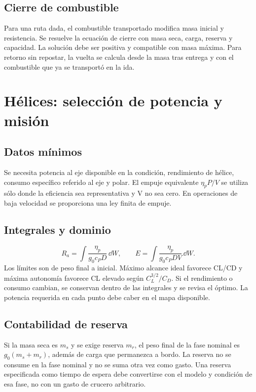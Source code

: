 \section{Cierre de combustible}
Para una ruta dada, el combustible transportado modifica masa inicial y resistencia. Se resuelve la ecuación de cierre con masa seca, carga, reserva y capacidad. La solución debe ser positiva y compatible con masa máxima. Para retorno sin repostar, la vuelta se calcula desde la masa tras entrega y con el combustible que ya se transportó en la ida.

\chapter{Hélices: selección de potencia y misión}
\section{Datos mínimos}
Se necesita potencia al eje disponible en la condición, rendimiento de hélice, consumo específico referido al eje y polar. El empuje equivalente $\eta_pP/V$ se utiliza sólo donde la eficiencia sea representativa y V no sea cero. En operaciones de baja velocidad se proporciona una ley finita de empuje.

\section{Integrales y dominio}
\begin{equation}
R_a=\int\frac{\eta_p}{g_0c_PD}\,\dd W,\qquad
E=\int\frac{\eta_p}{g_0c_PDV}\,\dd W.
\end{equation}
Los límites son de peso final a inicial. Máximo alcance ideal favorece CL/CD y máxima autonomía favorece CL elevado según $C_L^{3/2}/C_D$. Si el rendimiento o consumo cambian, se conservan dentro de las integrales y se revisa el óptimo. La potencia requerida en cada punto debe caber en el mapa disponible.

\section{Contabilidad de reserva}
Si la masa seca es $m_s$ y se exige reserva $m_r$, el peso final de la fase nominal es $g_0(m_s+m_r)$, además de carga que permanezca a bordo. La reserva no se consume en la fase nominal y no se suma otra vez como gasto. Una reserva especificada como tiempo de espera debe convertirse con el modelo y condición de esa fase, no con un gasto de crucero arbitrario.

